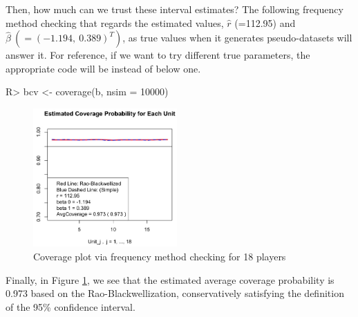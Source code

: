 \documentclass[article]{jss}
\begin{document}
Then, how much can we trust these interval estimates? The following frequency method checking that regards the estimated values, $\hat{r}$ (=112.95) and $\hat{\beta}~(=(-1.194, ~0.389)^{T})$, as true values when it generates pseudo-datasets will answer it. For reference, if we want to try different true parameters, the appropriate code will be  instead of below one.

\begin{CodeChunk}
\begin{CodeInput}
R> bcv <- coverage(b, nsim = 10000)
\end{CodeInput}
\end{CodeChunk}
\begin{figure}[h]
\begin{center}
\includegraphics[width = 5.5cm]{baseball2.png}
\caption{Coverage plot via frequency method checking for 18 players}
\label{fig:baseball2}
\end{center}
\end{figure}

Finally, in Figure \ref{fig:baseball2}, we see that the estimated average coverage probability is 0.973 based on the Rao-Blackwellization, conservatively satisfying the definition of the 95\% confidence interval. 



\end{document}
